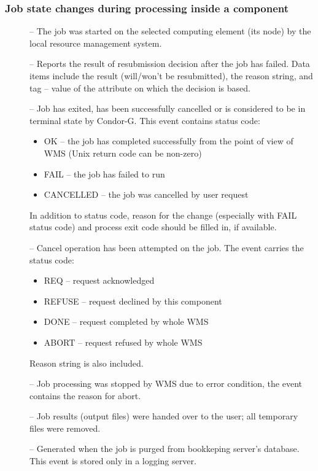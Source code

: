 \documentclass{egee}
\begin{document}
\subsubsection{Job state changes during processing inside a component}

\begin{description}
\item[\jobrun] -- The job was started on the selected computing element
(its node) by the local resource management system.
\item[\jobresub] -- Reports the result of resubmission decision after the job has failed. Data items include
the result (will/won't be resubmitted), the reason string, and tag -- value of the attribute on which the decision is based.
\item[\jobdone] -- Job has exited, has been successfully cancelled or is considered to be in terminal state by Condor-G.
This event contains status code:
\begin{itemize}
\item OK -- the job has completed successfully from the point of view of WMS
(Unix return code can be non-zero)
\item FAIL -- the job has failed to run
\item CANCELLED -- the job was cancelled by user request
\end{itemize}
In addition to status code, reason for the change (especially with FAIL status code) and process exit code should be filled in, if available. 
\item[\jobcancel] -- Cancel operation has been attempted on the job. The event
carries the status code:
\begin{itemize}
\item REQ -- request acknowledged
\item REFUSE -- request declined by this component
\item DONE -- request completed by whole WMS
\item ABORT -- request refused by whole WMS
\end{itemize}
Reason string is also included.
\item[\jobabort] -- Job processing was stopped by WMS due to error condition, the event contains the reason for abort.
\item[\jobcleared] -- Job results (output files) were handed over to the user; all temporary files were removed.
\item[\jobpurge] -- Generated when the job is purged from bookkeping server's database. This event is stored only in
a logging server.
\end{description}
\end{document}
